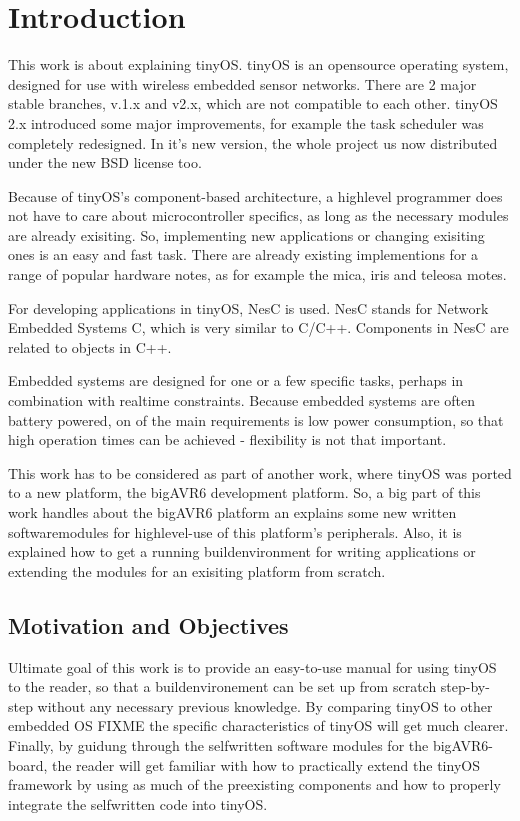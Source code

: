 
\chapter{Introduction} \label{chapter:introduction}

This work is about explaining tinyOS. tinyOS is an opensource operating system, designed for use with wireless embedded sensor networks. There are 2 major stable branches, v.1.x and v2.x, which are not compatible to each other. tinyOS 2.x introduced some major improvements, for example the task scheduler was completely redesigned. In it's new version, the whole project us now distributed under the new BSD license too.

Because of tinyOS's component-based architecture, a highlevel programmer does not have to care about microcontroller specifics, as long as the necessary modules are already exisiting. So, implementing new applications or changing exisiting ones is an easy and fast task. There are already existing implementions for a range of popular hardware notes, as for example the mica, iris and teleosa motes.

For developing applications in tinyOS, NesC is used. NesC stands for Network Embedded Systems C, which is very similar to C/C++. Components in NesC are related to objects in C++.

Embedded systems are designed for one or a few specific tasks, perhaps in combination with realtime constraints.
Because embedded systems are often battery powered, on of the main requirements is low power consumption, so that high operation times can be achieved - flexibility is not that important.

This work has to be considered as part of another work, where tinyOS was ported to a new platform, the bigAVR6 development platform. So, a big part of this work handles about the bigAVR6 platform an explains some new written softwaremodules for highlevel-use of this platform's peripherals. Also, it is explained how to get a running buildenvironment for writing applications or extending the modules for an exisiting platform from scratch.

\section{Motivation and Objectives}

Ultimate goal of this work is to provide an easy-to-use manual for using tinyOS to the reader, so that a buildenvironement can be set up from scratch step-by-step without any necessary previous knowledge. By comparing tinyOS to other embedded OS FIXME the specific characteristics of tinyOS will get much clearer. Finally, by guidung through the selfwritten software modules for the bigAVR6-board, the reader will get familiar with how to practically extend the tinyOS framework by using as much of the preexisting components and how to properly integrate the selfwritten code into tinyOS.

